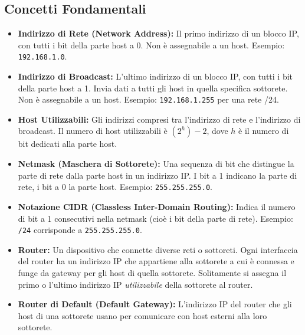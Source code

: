 \subsection{Concetti Fondamentali}
\begin{itemize}
    \item \textbf{Indirizzo di Rete (Network Address):} Il primo indirizzo di un blocco IP, con tutti i bit della parte host a 0. Non è assegnabile a un host. Esempio: \texttt{192.168.1.0}.
    \item \textbf{Indirizzo di Broadcast:} L'ultimo indirizzo di un blocco IP, con tutti i bit della parte host a 1. Invia dati a tutti gli host in quella specifica sottorete. Non è assegnabile a un host. Esempio: \texttt{192.168.1.255} per una rete /24.
    \item \textbf{Host Utilizzabili:} Gli indirizzi compresi tra l'indirizzo di rete e l'indirizzo di broadcast. Il numero di host utilizzabili è $(2^h) - 2$, dove $h$ è il numero di bit dedicati alla parte host.
    \item \textbf{Netmask (Maschera di Sottorete):} Una sequenza di bit che distingue la parte di rete dalla parte host in un indirizzo IP. I bit a 1 indicano la parte di rete, i bit a 0 la parte host. Esempio: \texttt{255.255.255.0}.
    \item \textbf{Notazione CIDR (Classless Inter-Domain Routing):} Indica il numero di bit a 1 consecutivi nella netmask (cioè i bit della parte di rete). Esempio: \texttt{/24} corrisponde a \texttt{255.255.255.0}.
    \item \textbf{Router:} Un dispositivo che connette diverse reti o sottoreti. Ogni interfaccia del router ha un indirizzo IP che appartiene alla sottorete a cui è connessa e funge da gateway per gli host di quella sottorete. Solitamente si assegna il primo o l'ultimo indirizzo IP \textit{utilizzabile} della sottorete al router.
    \item \textbf{Router di Default (Default Gateway):} L'indirizzo IP del router che gli host di una sottorete usano per comunicare con host esterni alla loro sottorete.
\end{itemize}

